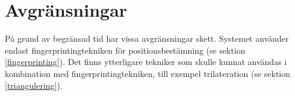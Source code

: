 \documentclass[swedish, a4paper,12pt]{article}
\begin{document}



\section{Avgränsningar}
På grund av begränsad tid har vissa avgränsningar skett. Systemet använder endast fingerprintingtekniken för positionsbestämning (se sektion \ref{fingerprinting}). Det finns ytterligare tekniker som skulle kunnat användas i kombination med fingerprintingtekniken, till exempel trilateration (se sektion \ref{triangulering}).
\end{document}
